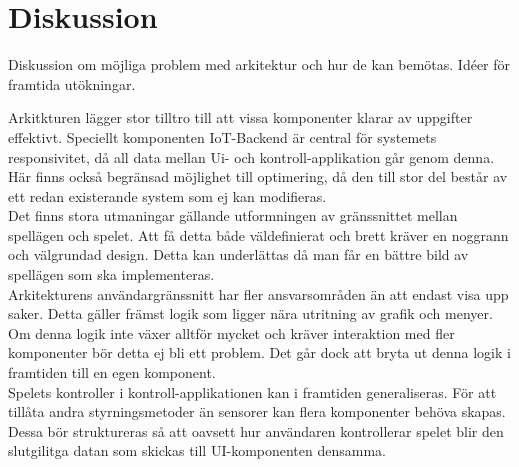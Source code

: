\section{Diskussion}
Diskussion om möjliga problem med arkitektur och hur de kan bemötas. Idéer för framtida utökningar.

Arkitkturen lägger stor tilltro till att vissa komponenter klarar av uppgifter effektivt. Speciellt komponenten IoT-Backend är central för systemets responsivitet, då all data mellan Ui- och kontroll-applikation går genom denna. Här finns också begränsad möjlighet till optimering, då den till stor del består av ett redan existerande system som ej kan modifieras.\\

Det finns stora utmaningar gällande utformningen av gränssnittet mellan spellägen och spelet. Att få detta både väldefinierat och brett kräver en noggrann och välgrundad design. Detta kan underlättas då man får en bättre bild av spellägen som ska implementeras.\\

Arkitekturens användargränssnitt har fler ansvarsområden än att endast visa upp saker. Detta gäller främst logik som ligger nära utritning av grafik och menyer. Om denna logik inte växer alltför mycket och kräver interaktion med fler komponenter bör detta ej bli ett problem. Det går dock att bryta ut denna logik i framtiden till en egen komponent.\\

Spelets kontroller i kontroll-applikationen kan i framtiden generaliseras. För att tillåta andra styrningsmetoder än sensorer kan flera komponenter behöva skapas. Dessa bör struktureras så att oavsett hur användaren kontrollerar spelet blir den slutgilitga datan som skickas till UI-komponenten densamma.
